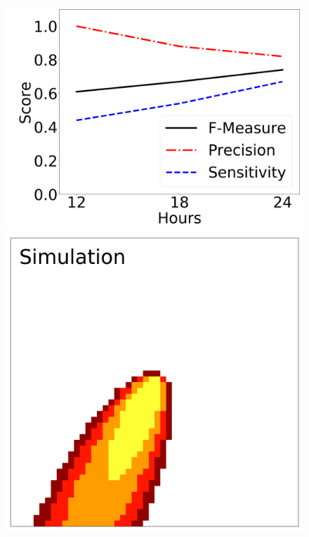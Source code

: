 \documentclass[smallcondensed]{svjour3}     %
\begin{document}
\begin{figure}[htbp]
	\includegraphics[height=0.16\textheight]{timeAnalysis_fmeasure3.png}
	\\
	\includegraphics[height=0.16\textheight]{timeAnalysis_simulation4.png}
	~

\end{figure}
\end{document}
